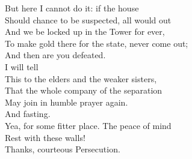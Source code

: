 \documentclass[a4paper,oneside,12pt]{memoir}
\begin{document}
\begin{drama*}
But here I cannot do it: if the house\\
Should chance to be suspected, all would out\\
And we be locked up in the Tower for ever,\\
To make gold there for the state, never come out;\\
And then are you defeated.\\
\persecutionspeaks {} I will tell\\
This to the elders and the weaker sisters,\\
That the whole company of the separation\\
May join in humble prayer again.\\
\subtlespeaks {} And fasting.\\
\persecutionspeaks Yea, for some fitter place. The peace of mind\\
Rest with these walls!\\
\subtlespeaks {} Thanks, courteous Persecution.\\

\scene


\end{drama*}
\end{document}
